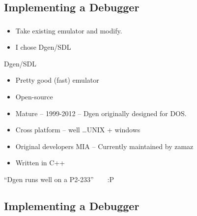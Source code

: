 \documentclass{beamer}
\begin{document}
\subsection{Implementing a Debugger}

\begin{frame}[fragile]
\frametitle{\insertsubsection}

\begin{itemize}
\item Take existing emulator and modify.
\item I chose Dgen/SDL
\end{itemize}

\vfill

\begin{block}{Dgen/SDL}
\begin{itemize}
\item Pretty good (fast) emulator
\item Open-source
\item Mature --  1999-2012 -- Dgen originally designed for DOS.
\item Cross platform -- well \ldots UNIX + windows
\item Original developers MIA -- Currently maintained by zamaz
\item Written in C++
\end{itemize}
\end{block}

\vfill

{\Large ``Dgen runs well on a P2-233''~~~~:P}

\end{frame}

\subsection{Implementing a Debugger}
\end{document}
